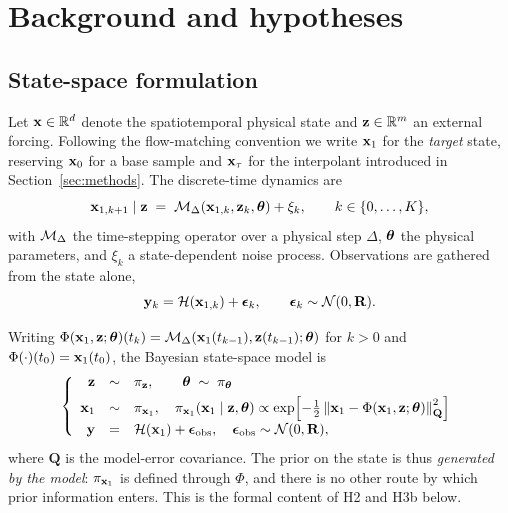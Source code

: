 \section{Background and hypotheses}
\label{sec:background}

\subsection{State-space formulation}
\label{sec:statespace}

Let $\mathbf{x} \in \mathbb{R}^d$ denote the spatiotemporal physical state and
$\mathbf{z} \in \mathbb{R}^m$ an external forcing. Following the flow-matching
convention we write $\mathbf{x}_1$ for the \emph{target} state, reserving $\mathbf{x}_0$ for a
base sample and $\mathbf{x}_\tau$ for the interpolant introduced in
Section~\ref{sec:methods}. The discrete-time dynamics are
\begin{equation}
  \label{eq:dynamics}
  \mathbf{x}_{1,k+1} \mid \mathbf{z} \;=\; \mathcal{M}_{\Delta}\!\left(\mathbf{x}_{1,k}, \mathbf{z}_{k}, \boldsymbol{\theta}\right) + \xi_k ,
  \qquad k \in \{0,\dots,K\},
\end{equation}
with $\mathcal{M}_{\Delta}$ the time-stepping operator over a physical step $\Delta$,
$\boldsymbol{\theta}$ the physical parameters, and $\xi_k$ a state-dependent noise process.
Observations are gathered from the state alone,
\begin{equation}
  \label{eq:obs}
  \mathbf{y}_k = \mathcal{H}(\mathbf{x}_{1,k}) + \boldsymbol{\epsilon}_k , \qquad \boldsymbol{\epsilon}_k \sim \mathcal{N}(0, \mathbf{R}).
\end{equation}

Writing $\Phi(\mathbf{x}_1, \mathbf{z}; \boldsymbol{\theta})(t_k) = \mathcal{M}_\Delta(\mathbf{x}_1(t_{k-1}), \mathbf{z}(t_{k-1}); \boldsymbol{\theta})$
for $k>0$ and $\Phi(\cdot)(t_0) = \mathbf{x}_1(t_0)$, the Bayesian state-space model is
\begin{equation}
  \label{eq:ssm}
  \left\{
  \begin{array}{rcl}
    \mathbf{z} &\sim& \pi_{\mathbf{z}}, \qquad \boldsymbol{\theta} \;\sim\; \pi_{\boldsymbol{\theta}} \\[0.35em]
    \mathbf{x}_1 &\sim& \pi_{\mathbf{x}_1}, \quad
      \pi_{\mathbf{x}_1}\!\left(\mathbf{x}_1 \mid \mathbf{z}, \boldsymbol{\theta}\right) \propto
      \exp\!\left[-\tfrac{1}{2}\left\|\mathbf{x}_1 - \Phi(\mathbf{x}_1, \mathbf{z}; \boldsymbol{\theta})\right\|^2_{\mathbf{Q}}\right] \\[0.35em]
    \mathbf{y} &=& \mathcal{H}(\mathbf{x}_1) + \boldsymbol{\epsilon}_{\mathrm{obs}}, \quad \boldsymbol{\epsilon}_{\mathrm{obs}} \sim \mathcal{N}(0,\mathbf{R}),
  \end{array}\right.
\end{equation}
where $\mathbf{Q}$ is the model-error covariance. The prior on the state is thus
\emph{generated by the model}: $\pi_{\mathbf{x}_1}$ is defined through $\Phi$, and there
is no other route by which prior information enters. This is the formal content
of H2 and H3b below.

